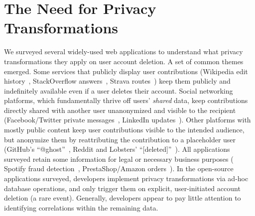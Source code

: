 \section{The Need for Privacy Transformations}
\label{sec:survey}

%
We surveyed several widely-used web applications to understand what privacy transformations
they apply on user account deletion.
%
A set of common themes emerged.
%
Some services that publicly display user contributions (\eg Wikipedia edit
history~\cite{wikipedia:privacy}, StackOverflow answers~\cite{stackoverflow:privacy},
Strava routes~\cite{strava:privacy}) keep them publicly and indefinitely available even if a user deletes
their account.
%
Social networking platforms, which fundamentally thrive off users' \emph{shared} data, keep
contributions directly shared with another user unanonymized and visible to the recipient
(\eg Facebook/Twitter private messages~\cite{facebook:privacy, twitter:privacy},
LinkedIn updates~\cite{linkedin:privacy}).
%
Other platforms with mostly public content keep user contributions visible to the intended
audience, but anonymize them by reattributing the contribution to a placeholder user
(\eg GitHub's ``@ghost''~\cite{github:privacy}, Reddit and Lobsters'
``[deleted]''~\cite{reddit:privacy, lobsters:privacy}).
%
%
All applications surveyed retain some information for legal or necessary business purposes (\eg
Spotify fraud detection~\cite{spotify:privacy}, PrestaShop/Amazon orders~\cite{amazon:privacy,
prestashop:privacy}).
%
In the open-source applications surveyed, developers implement privacy transformations
via ad-hoc database operations, and only trigger them on explicit, user-initiated account
deletion (a rare event).
%
Generally, developers appear to pay little attention to identifying correlations
within the remaining data.
%

